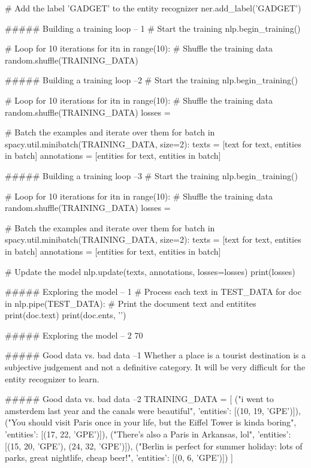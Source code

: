 # Add the label 'GADGET' to the entity recognizer
ner.add_label('GADGET')


##### Building a training loop  -- 1
# Start the training
nlp.begin_training()

# Loop for 10 iterations
for itn in range(10):
    # Shuffle the training data
    random.shuffle(TRAINING_DATA)


##### Building a training loop  --2
# Start the training
nlp.begin_training()

# Loop for 10 iterations
for itn in range(10):
    # Shuffle the training data
    random.shuffle(TRAINING_DATA)
    losses = {}
    
    # Batch the examples and iterate over them
    for batch in spacy.util.minibatch(TRAINING_DATA, size=2):
        texts = [text for text, entities in batch]
        annotations = [entities for text, entities in batch]


##### Building a training loop  --3
# Start the training
nlp.begin_training()

# Loop for 10 iterations
for itn in range(10):
    # Shuffle the training data
    random.shuffle(TRAINING_DATA)
    losses = {}
    
    # Batch the examples and iterate over them
    for batch in spacy.util.minibatch(TRAINING_DATA, size=2):
        texts = [text for text, entities in batch]
        annotations = [entities for text, entities in batch]
        
        # Update the model
        nlp.update(texts, annotations, losses=losses)
        print(losses)


##### Exploring the model  -- 1
# Process each text in TEST_DATA
for doc in nlp.pipe(TEST_DATA):
    # Print the document text and entitites
    print(doc.text)
    print(doc.ents, '\n\n')


##### Exploring the model  -- 2
70%


##### Good data vs. bad data   --1
Whether a place is a tourist destination is a subjective judgement and not a definitive category. It will be very difficult for the entity recognizer to learn.



##### Good data vs. bad data   --2
TRAINING_DATA = [
    ("i went to amsterdem last year and the canals were beautiful", {'entities': [(10, 19, 'GPE')]}),
    ("You should visit Paris once in your life, but the Eiffel Tower is kinda boring", {'entities': [(17, 22, 'GPE')]}),
    ("There's also a Paris in Arkansas, lol", {'entities': [(15, 20, 'GPE'), (24, 32, 'GPE')]}),
    ("Berlin is perfect for summer holiday: lots of parks, great nightlife, cheap beer!", {'entities': [(0, 6, 'GPE')]})
]

